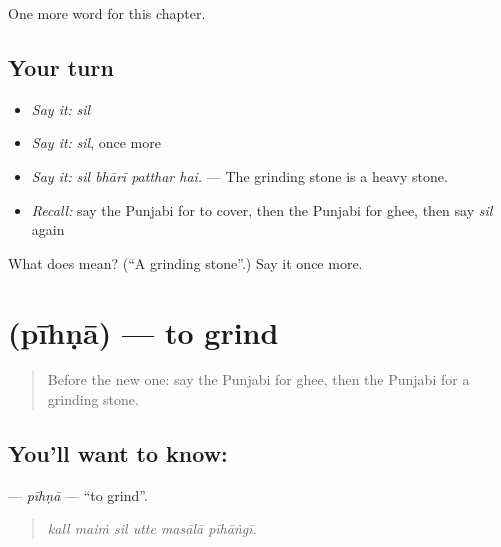 \begin{grammarlens}[title={What you've built}]
One more word for this chapter.
\end{grammarlens}

\subsection*{Your turn}
\begin{itemize}
\raggedright
  \item \emph{Say it:} \emph{sil}
  \item \emph{Say it:} \emph{sil}, once more
  \item \emph{Say it:} \emph{sil bhārī patthar hai.} — The grinding stone is a heavy stone.
  \item \emph{Recall:} say the Punjabi for to cover, then the Punjabi for ghee, then say \emph{sil} again
\end{itemize}

\begin{tcolorbox}[breakable,colback=teal!4,colframe=teal!35!black,title={Before you move on}]
What does  mean? (\textquotedblleft{}A grinding stone\textquotedblright{}.) Say it once more.
\end{tcolorbox}
\section[\texorpdfstring{\pa{ਪੀਹਣਾ} (pīhṇā)}{ਪੀਹਣਾ (pīhṇā)}]{ (pīhṇā) — to grind}

\label{lesson:PA-C240-pihna}



\begin{quote}
Before the new one: say the Punjabi for ghee, then the Punjabi for a grinding stone.
\end{quote}

\subsection*{You'll want to know: }
\textbf{} — \emph{pīhṇā} — \textquotedblleft{}to grind\textquotedblright{}.

\begin{quote}
     
\end{quote}

\begin{quote}
\emph{kall maiṁ sil utte masālā pīhāṅgī.}
\end{quote}

